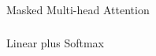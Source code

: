 \begin{frame}[fragile]\frametitle{}
\begin{center}
{\Large Masked Multi-head Attention}
\end{center}
\end{frame}


\begin{frame}[fragile]\frametitle{}
\begin{center}
{\Large Linear plus Softmax}
\end{center}
\end{frame}


			
			
		



			
			
		




			

